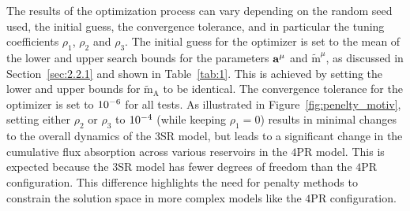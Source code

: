 \documentclass[11pt, a4paper, pdftex, twoside, dvipsnames]{article}
\renewcommand{\ref}{\cref}
\newcommand{\bb}[1]{\boldsymbol{\bold{#1}}}
\newcommand{\bbt}[1]{\tilde{\boldsymbol{\mathrm{#1}}}}
\newcommand{\expnum}[2]{
\ifnum#1=1 
  10^{#2} 
\else 
  #1 \! \cdot \! 10^{#2}
\fi
}
\begin{document}
The results of the optimization process can vary depending on the random seed used, the initial guess, the convergence tolerance, and in particular the tuning coefficients $\rho_1$, $\rho_2$ and $\rho_3$. 
%
The initial guess for the optimizer is set to the mean of the lower and upper search bounds for the parameters $\bb{a}^{\mu}$ and $\bbt{m}^{\mu}$, as discussed in Section~\ref{sec:2.2.1} and shown in Table~\ref{tab:1}.
%
This is achieved by setting the lower and upper bounds for $\bbt{m}_{\text{A}}$ to be identical.
%
The convergence tolerance for the optimizer is set to $\expnum{1}{-6}$ for all tests.
%
As illustrated in Figure~\ref{fig:penelty_motiv}, setting either $\rho_2$ or $\rho_3$ to  $\expnum{1}{-4}$ (while keeping $\rho_1=0$) results in minimal changes to the overall dynamics of the $3$SR model, but leads to a significant change in the cumulative flux absorption across various reservoirs in the $4$PR model.
%
This is expected because the $3$SR model has fewer degrees of freedom than the $4$PR configuration. 
%
This difference highlights the need for penalty methods to constrain the solution space in more complex models like the $4$PR configuration.
\end{document}
